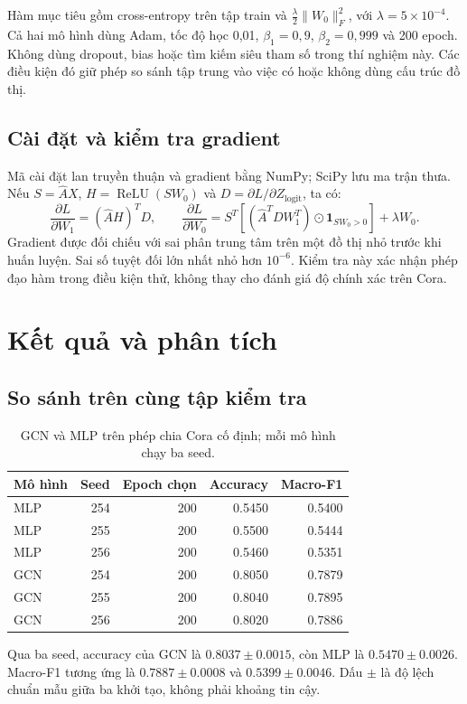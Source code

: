 Hàm mục tiêu gồm cross-entropy trên tập train và $\frac{\lambda}{2}\lVert W_0\rVert_F^2$, với $\lambda=5\times10^{-4}$. Cả hai mô hình dùng Adam, tốc độ học 0,01, $\beta_1=0,9$, $\beta_2=0,999$ và 200 epoch. Không dùng dropout, bias hoặc tìm kiếm siêu tham số trong thí nghiệm này. Các điều kiện đó giữ phép so sánh tập trung vào việc có hoặc không dùng cấu trúc đồ thị.

\subsection{Cài đặt và kiểm tra gradient}
Mã  cài đặt lan truyền thuận và gradient bằng NumPy; SciPy lưu ma trận thưa. Nếu $S=\widehat AX$, $H=\operatorname{ReLU}(SW_0)$ và $D=\partial L/\partial Z_{\mathrm{logit}}$, ta có:
\[
\frac{\partial L}{\partial W_1}=(\widehat AH)^TD,\qquad
\frac{\partial L}{\partial W_0}=S^T\left[(\widehat A^TDW_1^T)\odot\mathbf1_{SW_0>0}\right]+\lambda W_0.
\]
Gradient được đối chiếu với sai phân trung tâm trên một đồ thị nhỏ trước khi huấn luyện. Sai số tuyệt đối lớn nhất nhỏ hơn $10^{-6}$. Kiểm tra này xác nhận phép đạo hàm trong điều kiện thử, không thay cho đánh giá độ chính xác trên Cora.
\section{Kết quả và phân tích}
\subsection{So sánh trên cùng tập kiểm tra}
\begin{table}[H]\centering\small\caption{GCN và MLP trên phép chia Cora cố định; mỗi mô hình chạy ba seed.}\label{tab:cora-results}
\begin{tabular}{lrrrr}\toprule Mô hình & Seed & Epoch chọn & Accuracy & Macro-F1\\\midrule
MLP & 254 & 200 & 0.5450 & 0.5400\\
MLP & 255 & 200 & 0.5500 & 0.5444\\
MLP & 256 & 200 & 0.5460 & 0.5351\\
GCN & 254 & 200 & 0.8050 & 0.7879\\
GCN & 255 & 200 & 0.8040 & 0.7895\\
GCN & 256 & 200 & 0.8020 & 0.7886\\
\bottomrule\end{tabular}\end{table}
Qua ba seed, accuracy của GCN là $0.8037\pm0.0015$, còn MLP là $0.5470\pm0.0026$. Macro-F1 tương ứng là $0.7887\pm0.0008$ và $0.5399\pm0.0046$. Dấu $\pm$ là độ lệch chuẩn mẫu giữa ba khởi tạo, không phải khoảng tin cậy.

